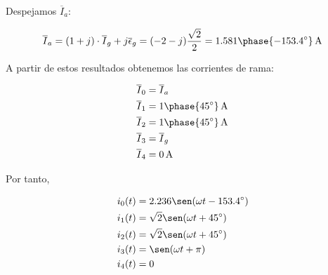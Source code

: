 \documentclass[12pt]{article}
\begin{document}
Despejamos $\overline{I}_a$:

\[
  \overline{I}_a = (1 + j)\cdot \overline{I}_g + j \overline{\epsilon}_g = (-2 - j) \frac{\sqrt{2}}{2}  = \SI[parse-numbers=false]{1.581\phase{\ang{-153.4}}}{\ampere}\\
\]

A partir de estos resultados obtenemos las corrientes de rama:

\begin{align*}
  \overline{I}_0 &= \overline{I}_a\\
  \overline{I}_1 &= \SI[parse-numbers=false]{1\phase{\ang{45}}}{\ampere}\\
  \overline{I}_2 &= \SI[parse-numbers=false]{1\phase{\ang{45}}}{\ampere}\\
  \overline{I}_3 &= \overline{I}_g\\
  \overline{I}_4 &= \SI{0}{\ampere}\\
\end{align*}

Por tanto,

\begin{align*}
  i_0(t) &= 2.236 \sen(\omega t -\ang{153.4})\\
  i_1(t) &= \sqrt{2} \sen(\omega t + \ang{45})\\
  i_2(t) &= \sqrt{2} \sen(\omega t + \ang{45})\\
  i_3(t) &= \sen(\omega t + \pi)\\
  i_4(t) &= 0
\end{align*}
\end{document}
